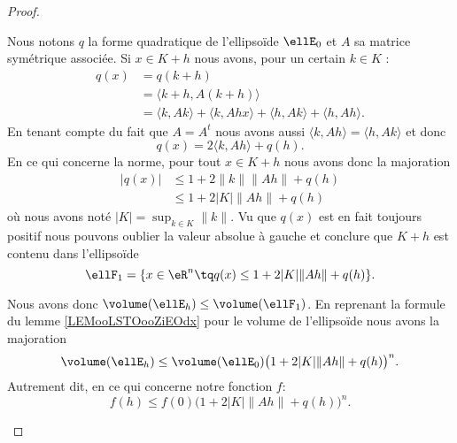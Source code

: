 \begin{proof}
	\begin{subproof}
		Nous notons \( q\) la forme quadratique de l'ellipsoïde \( \ellE_0\) et \( A\) sa matrice symétrique associée. Si \( x\in K+h\) nous avons, pour un certain \( k\in K\) :
		\begin{subequations}
			\begin{align}
				q(x) & =q(k+h)                                                                                   \\
				     & =\langle k+h, A(k+h)\rangle                                                               \\
				     & =\langle k,Ak \rangle +\langle k,Ahx \rangle +\langle h, Ak\rangle +\langle h, Ah\rangle.
			\end{align}
		\end{subequations}
		En tenant compte du fait que \( A=A^t\) nous avons aussi \( \langle k, Ah\rangle =\langle h, Ak\rangle \) et donc
		\begin{equation}
			q(x)=2\langle k, Ah\rangle +q(h).
		\end{equation}
		En ce qui concerne la norme, pour tout \( x\in K+h\) nous avons donc la majoration
		\begin{subequations}
			\begin{align}
				| q(x) | & \leq 1+2\| k \|\| Ah \|+q(h) \\
				         & \leq 1+2| K |\| Ah \|+q(h)
			\end{align}
		\end{subequations}
		où nous avons noté \( | K |=\sup_{k\in K}\| k \|\). Vu que \( q(x)\) est en fait toujours positif nous pouvons oublier la valeur absolue à gauche et conclure que \( K+h\) est contenu dans l'ellipsoïde
		\begin{equation}
			\ellF_1=\{ x\in \eR^n\tq q(x)\leq 1+2| K |\| Ah \|+q(h) \}.
		\end{equation}

		\spitem[Volumes]

		Nous avons donc \( \volume(\ellE_h)\leq \volume(\ellF_1)\). En reprenant la formule du lemme \ref{LEMooLSTOooZiEOdx} pour le volume de l'ellipsoïde nous avons la majoration
		\begin{equation}
			\volume(\ellE_h)\leq \volume(\ellE_0)\big( 1+2| K |\| Ah \|+q(h) \big)^n.
		\end{equation}
		Autrement dit, en ce qui concerne notre fonction \( f\):
		\begin{equation}        \label{EQooLVZCooJVxVNx}
			f(h)\leq f(0)\big( 1+2| K |\| Ah \|+q(h) \big)^n.
		\end{equation}


\end{subproof}
\end{proof}

